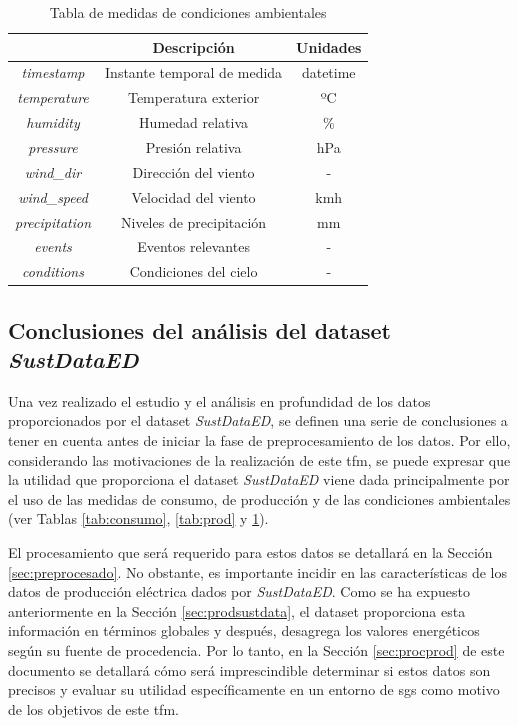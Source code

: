 \begin{table}[h!]
    \centering
    \begin{tabular}{|c|c|c|}
    \hline
    \rowcolor[HTML]{AAAAAA} 
    \multicolumn{1}{|c|}{\cellcolor[HTML]{AAAAAA}Campo} & \multicolumn{1}{c|}{\cellcolor[HTML]{AAAAAA}Descripción} & Unidades \\ \hline
    \textit{timestamp} & Instante temporal de medida & datetime \\ \hline
    \textit{temperature} & Temperatura exterior & ºC \\ \hline
    \textit{humidity} & Humedad relativa & \% \\ \hline
    \textit{pressure} & Presión relativa & hPa \\ \hline
    \textit{wind\_dir} & Dirección del viento & - \\ \hline
    \textit{wind\_speed} & Velocidad del viento & kmh \\ \hline
    \textit{precipitation} & Niveles de precipitación & mm \\ \hline
    \textit{events} & Eventos relevantes & - \\ \hline
    \textit{conditions} & Condiciones del cielo & - \\ \hline
    \end{tabular}
    \caption{Tabla de medidas de condiciones ambientales \cite{sustdata}}
    \label{tab:env}
\end{table}

\subsection{Conclusiones del análisis del dataset \textit{SustDataED}}
\label{sec:conclusionessustdata}

Una vez realizado el estudio y el análisis en profundidad de los datos proporcionados por el dataset \textit{SustDataED}, se definen una serie de conclusiones a tener en cuenta antes de iniciar la fase de preprocesamiento de los datos. Por ello, considerando las motivaciones de la realización de este \gls{tfm}, se puede expresar que la utilidad que proporciona el dataset \textit{SustDataED} viene dada principalmente por el uso de las medidas de consumo, de producción y de las condiciones ambientales (ver Tablas \ref{tab:consumo}, \ref{tab:prod} y \ref{tab:env}). 

\vspace{3mm}

El procesamiento que será requerido para estos datos se detallará en la Sección \ref{sec:preprocesado}. No obstante, es importante incidir en las características de los datos de producción eléctrica dados por \textit{SustDataED}. Como se ha expuesto anteriormente en la Sección \ref{sec:prodsustdata}, el dataset proporciona esta información en términos globales y después, desagrega los valores energéticos según su fuente de procedencia. Por lo tanto, en la Sección \ref{sec:procprod} de este documento se detallará cómo será imprescindible determinar si estos datos son precisos y evaluar su utilidad específicamente en un entorno de \gls{sg}s como motivo de los objetivos de este \gls{tfm}.

